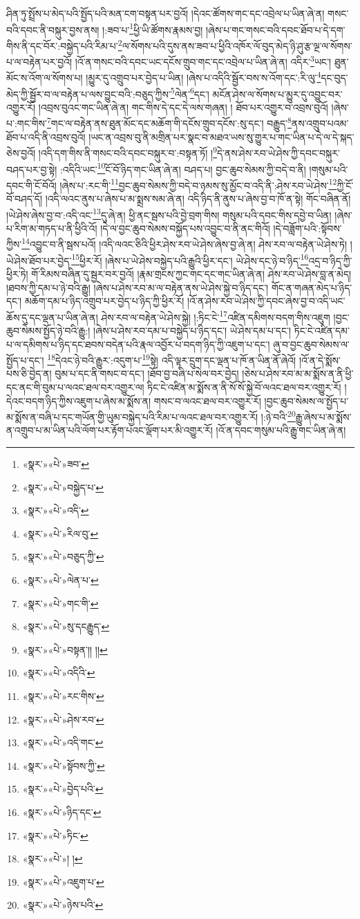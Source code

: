 ཤིན་ཏུ་སྤྲོས་པ་མེད་པའི་སྤྱོད་པའི་མན་ངག་བསྟན་པར་བྱའོ། །དེའང་ཚོགས་གང་དང་འབྲེལ་པ་ཡིན་ཞེ་ན། གསང་བའི་དབང་ནི་བསྐུར་བྱས་ནས། །:ཟབ་པ་\footnote{«སྣར་»«པེ་»ཟབ་}ཕྱི་ཡི་ཚོགས་རྣམས་བྱ། །ཞེས་པ་གང་གསང་བའི་དབང་ཐོབ་པ་དེ་དག་གིས་ནི་དང་བོར་:བསྐྱེད་པའི་རིམ་པ་\footnote{«སྣར་»«པེ་»བསྐྱེད་པ་}ལ་སོགས་པའི་དུས་ནས་ཟབ་པ་ཕྱིའི་འཁོར་ལོ་བུད་མེད་ཉི་ཤུ་རྩ་ལྔ་ལ་སོགས་པ་ལ་བརྟེན་པར་བྱའོ། །འོ་ན་གསང་བའི་དབང་ཡང་དངོས་གྲུབ་གང་དང་འབྲེལ་པ་ཡིན་ཞེ་ན། འདིར་\footnote{«སྣར་»«པེ་»འདི་}ཡང་། ཐུན་མོང་ས་འོག་ལ་སོགས་པ། །མྱུར་དུ་འགྲུབ་པར་བྱེད་པ་ཡིན། །ཞེས་པ་འདིའི་སྦྱོར་བས་ས་འོག་དང་:རི་ལུ་\footnote{«སྣར་»«པེ་»རིལ་བུ་}དང་བུད་མེད་ཀྱི་སྦྱོར་བ་ལ་བརྟེན་པ་ལས་བྱུང་བའི་:བཅུད་ཀྱིས་\footnote{«སྣར་»«པེ་»བཅུད་ཀྱི་}ལེན་\footnote{«སྣར་»«པེ་»ལེན་པ་}དང་། མངོན་ཤེས་ལ་སོགས་པ་མྱུར་དུ་འབྱུང་བར་འགྱུར་རོ། །འབྲས་བུའང་གང་ཡིན་ཞེ་ན། གང་གིས་དེ་དང་དེ་ལས་གཞན། །
ཐོབ་པར་འགྱུར་བ་འབྲས་བུའོ། །ཞེས་པ་:གང་གིས་\footnote{«སྣར་»«པེ་»གང་གི་}གང་ལ་བརྟེན་ནས་ཐུན་མོང་དང་མཆོག་གི་དངོས་གྲུབ་དངོས་:སུ་དང་། བརྒྱུད་\footnote{«སྣར་»«པེ་»སུ་དངརྒྱུད་}ནས་འགྲུབ་པའམ་ཐོབ་པ་འདི་ནི་འབྲས་བུའོ། །ཡང་ན་འབྲས་བུ་ནི་མགྲིན་པར་སྣང་བ་མཐའ་ཡས་སུ་གྱུར་པ་གང་ཡིན་པ་དེ་ལ་དེ་སྐད་ཅེས་བྱའོ། །འདི་དག་གིས་ནི་གསང་བའི་དབང་བསྐུར་བ་:བསྟན་ཏོ། །\footnote{«སྣར་»«པེ་»བསྟན་།། །།}དེ་ནས་ཤེས་རབ་ཡེ་ཤེས་ཀྱི་དབང་བསྐུར་བཤད་པར་བྱ་སྟེ། :འདིའི་ཡང་\footnote{«སྣར་»«པེ་»འདིའི་}ངོ་བོ་ཉིད་གང་ཡིན་ཞེ་ན། བཤད་པ། བྱང་ཆུབ་སེམས་ཀྱི་བདེ་བ་ནི། །གསུམ་པའི་དབང་གི་ངོ་བོའོ། །ཞེས་པ་:རང་གི་\footnote{«སྣར་»«པེ་»རང་གིས་}བྱང་ཆུབ་སེམས་ཀྱི་བདེ་བ་ཉམས་སུ་མྱོང་བ་འདི་ནི་:ཤེས་རབ་ཡེ་ཤེས་\footnote{«སྣར་»«པེ་»ཤེས་རབ་}ཀྱི་ངོ་བོ་བཤད་དོ། །འདི་ལའང་ནུས་པ་ཞེས་པ་མ་སྨྲས་སམ་ཞེ་ན། འདི་ཉིད་ནི་ནུས་པ་ཞེས་བྱ་བ་ཁོ་ན་སྟེ། གོང་བཞིན་ནོ། །ཡེ་ཤེས་ཞེས་བྱ་བ་:འདི་འང་\footnote{«སྣར་»«པེ་»འདི་གང་}དུ་ཞེ་ན། ཕྱི་ནང་སྦས་པའི་བྱེ་བྲག་གིས། གསུམ་པའི་དབང་གིས་དབྱེ་བ་ཡིན། །ཞེས་པ་རིག་མ་གཏད་པ་ནི་ཕྱིའི་འོ། །དེ་ལ་བྱང་ཆུབ་སེམས་བསྐྱོད་པས་འབྱུང་བ་ནི་ནང་གིའོ། །དེ་བཟློག་པའི་:སྟོབས་ཀྱིས་\footnote{«སྣར་»«པེ་»སྟོབས་ཀྱི་}འབྱུང་བ་ནི་སྦས་པའོ། །འདི་ལའང་ཅིའི་ཕྱིར་ཤེས་རབ་ཡེ་ཤེས་ཞེས་བྱ་ཞེ་ན། ཤེས་རབ་ལ་བརྟེན་ཡེ་ཤེས་ཏེ། །ཡེ་ཤེས་ཐོབ་པར་བྱེད་\footnote{«སྣར་»«པེ་»བྱེད་པའི་}ཕྱིར་རོ། །ཞེས་པ་ཡེ་ཤེས་བསྐྱེད་པའི་རྒྱུའི་ཕྱིར་དང་། ཡེ་ཤེས་དང་ཉེ་བ་ཉིད་\footnote{«སྣར་»«པེ་»ཉིད་དང་}འདྲ་བ་ཉིད་ཀྱི་ཕྱིར་ཏེ། གོ་རིམས་བཞིན་དུ་སྦྱར་བར་བྱའོ། །རྣམ་གྲངས་ཀྱང་གང་དང་གང་ཡིན་ཞེ་ན། ཤེས་རབ་ཡེ་ཤེས་བླ་ན་མེད། །ཐབས་ཀྱི་དམ་པ་ཉེ་བའི་རྒྱུ། །ཞེས་པ་ཤེས་རབ་མ་ལ་བརྟེན་ནས་ཡེ་ཤེས་སྐྱེ་བ་ཉིད་དང་། གོང་ན་གཞན་མེད་པ་ཉིད་དང་། མཆོག་དམ་པ་ཉིད་འགྲུབ་པར་བྱེད་པ་ཉིད་ཀྱི་ཕྱིར་རོ། །འོ་ན་ཤེས་རབ་ཡེ་ཤེས་ཀྱི་དབང་ཞེས་བྱ་བ་འདི་ཡང་ཆོས་དུ་དང་ལྡན་པ་ཡིན་ཞེ་ན། ཤེས་རབ་ལ་བརྟེན་ཡེ་ཤེས་སྐྱེ། །:ཏིང་ངེ་\footnote{«སྣར་»«པེ་»ཏིང་}འཛིན་དམིགས་བདག་གིས་འཇུག །བྱང་ཆུབ་སེམས་སྤྱོད་ཉེ་བའི་རྒྱུ:། །ཞེས་པ་ཤེས་རབ་དམ་པ་བསྐྱེད་པ་ཉིད་དང་། ཡེ་ཤེས་དམ་པ་དང་། ཏིང་ངེ་འཛིན་དམ་པ་ལ་དམིགས་པ་ཉིད་དང་ཐབས་བདེན་པའི་རྣལ་འབྱོར་པ་བདག་ཉིད་ཀྱི་འཇུག་པ་དང་། ཞུ་བ་བྱང་ཆུབ་སེམས་ལ་སྤྱོད་པ་དང་། \footnote{«སྣར་»«པེ་»། ། }དེའང་ཉེ་བའི་རྒྱུར་:འདུག་པ་\footnote{«སྣར་»«པེ་»འཇུག་པ་}སྟེ། འདི་ལྟར་དྲུག་དང་ལྡན་པ་ཁོ་ན་ཡིན་ནོ་ཞེའོ། །འོ་ན་དེ་སྨོས་པས་ཅི་བྱེད་ན། བུམ་པ་དང་ནི་གསང་བ་དང་། །ཐོབ་བྱ་བཞི་པ་སེལ་བར་བྱེད། །ཅེས་པ་ཤེས་རབ་མ་མ་སྨོས་ན་ནི་ཕྱི་དང་ནང་གི་བུམ་པ་ལའང་ཐལ་བར་འགྱུར་ལ། ཏིང་ངེ་འཛིན་མ་སྨོས་ན་ནི་སོ་སོ་སྐྱེ་བོ་ལའང་ཐལ་བར་འགྱུར་རོ། །དེའང་བདག་ཉིད་ཀྱིས་འཇུག་པ་ཞེས་མ་སྨོས་ན། གསང་བ་ལའང་ཐལ་བར་འགྱུར་རོ། །བྱང་ཆུབ་སེམས་ལ་སྤྱོད་པ་མ་སྨོས་ན་བཞི་པ་དང་གཡོན་གྱི་ཡུམ་བསྐྱེད་པའི་རིམ་པ་ལའང་ཐལ་བར་འགྱུར་རོ། །:ཉེ་བའི་\footnote{«སྣར་»«པེ་»ཉེས་པའི་}རྒྱུ་ཞེས་པ་མ་སྨོས་ན་འགྲུབ་པ་མ་ཡིན་པའི་ལོག་པར་རྟོག་པའང་ལྡོག་པར་མི་འགྱུར་རོ། །འོ་ན་དབང་གསུམ་པའི་རྒྱུ་གང་ཡིན་ཞེ་ན། 
